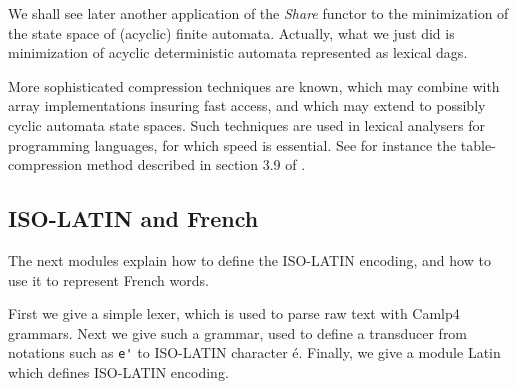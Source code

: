 We shall see later another application of the {\sl Share}
functor to the minimization of the state space of (acyclic) finite automata.
Actually, what we just did is minimization of acyclic deterministic 
automata represented as lexical dags. 

More sophisticated compression techniques are known, which may combine with
array implementations insuring fast access, and which may extend to possibly
cyclic automata state spaces. Such techniques are used in lexical analysers
for programming languages, for which speed is essential. See for instance
the table-compression method described in section 3.9 of \cite{asu}.

\subsection{ISO-LATIN and French}

The next modules explain how to define the ISO-LATIN encoding, and
how to use it to represent French words. 

First we give a simple lexer, which is used to parse raw text with
Camlp4 grammars. Next we give such a grammar, used to define a
transducer from notations such as \verb:e': to ISO-LATIN character
\'e. Finally, we give a module Latin which defines ISO-LATIN encoding.



